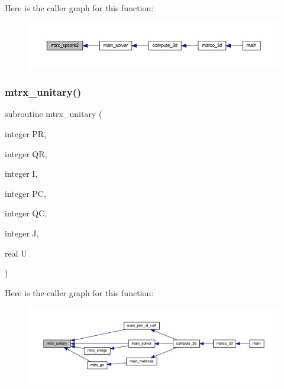 Here is the caller graph for this function\+:
\nopagebreak
\begin{figure}[H]
\begin{center}
\leavevmode
\includegraphics[width=350pt]{Marco_8f90_ac9d0c58e3d3c8bd0e73c6eb53c79f71c_icgraph}
\end{center}
\end{figure}
\mbox{\label{Marco_8f90_a4eb03ca80bb56e17c8df38828e960f09}} 
\subsubsection{\texorpdfstring{mtrx\+\_\+unitary()}{mtrx\_unitary()}}
{\footnotesize\ttfamily subroutine mtrx\+\_\+unitary (\begin{DoxyParamCaption}\item[{integer}]{PR,  }\item[{integer}]{QR,  }\item[{integer}]{I,  }\item[{integer}]{PC,  }\item[{integer}]{QC,  }\item[{integer}]{J,  }\item[{real}]{U }\end{DoxyParamCaption})}

Here is the caller graph for this function\+:
\nopagebreak
\begin{figure}[H]
\begin{center}
\leavevmode
\includegraphics[width=350pt]{Marco_8f90_a4eb03ca80bb56e17c8df38828e960f09_icgraph}
\end{center}
\end{figure}
\mbox{\label{Marco_8f90_aec081d732a45837d045636e3ab309eb3}} 
